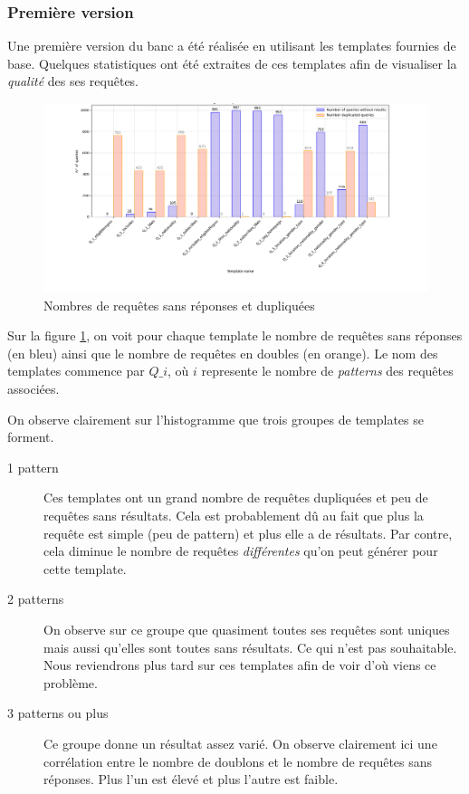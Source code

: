 \documentclass[12pt,titlepage]{article}
\begin{document}
\subsubsection{Première version}

Une première version du banc a été réalisée en utilisant les templates fournies de base. Quelques statistiques ont été extraites de ces templates afin de visualiser la \textit{qualité} des ses requêtes.

\begin{figure}[!h]
\centering
\includegraphics[width=1.\textwidth]{img/zero_dup_per_template.png}
\caption{Nombres de requêtes sans réponses et dupliquées}
\label{zerodup}
\end{figure}

Sur la figure \ref{zerodup}, on voit pour chaque template le nombre de requêtes sans réponses (en bleu) ainsi que le nombre de requêtes en doubles (en orange). Le nom des templates commence par $Q\_i$, où $i$ represente le nombre de \textit{patterns} des requêtes associées.

On observe clairement sur l'histogramme que trois groupes de templates se forment.

\begin{description}
\item[1 pattern] Ces templates ont un grand nombre de requêtes dupliquées et peu de requêtes sans résultats. Cela est probablement dû au fait que plus la requête est simple (peu de pattern) et plus elle a de résultats. Par contre, cela diminue le nombre de requêtes \textit{différentes} qu'on peut générer pour cette template.
\item[2 patterns] On observe sur ce groupe que quasiment toutes ses requêtes sont uniques mais aussi qu'elles sont toutes sans résultats. Ce qui n'est pas souhaitable. Nous reviendrons plus tard sur ces templates afin de voir d'où viens ce problème.
\item[3 patterns ou plus] Ce groupe donne un résultat assez varié. On observe clairement ici une corrélation entre le nombre de doublons et le nombre de requêtes sans réponses. Plus l'un est élevé et plus l'autre est faible.
\end{description}
\end{document}
